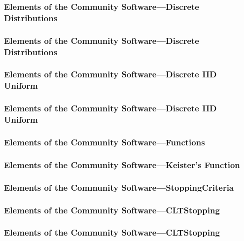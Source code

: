 \documentclass[11pt,compress,xcolor={usenames,dvipsnames},aspectratio=169]{beamer}
\begin{document}
\begin{frame}[fragile]
\frametitle{Elements of the Community Software---Discrete Distributions}
\vspace{-5ex}

\end{frame}

\begin{frame}[fragile]
\frametitle{Elements of the Community Software---Discrete Distributions}
\vspace{-5ex}

\end{frame}

\begin{frame}[fragile]
\frametitle{Elements of the Community Software---Discrete IID Uniform}
\vspace{-5ex}

\end{frame}

\begin{frame}[fragile]
\frametitle{Elements of the Community Software---Discrete IID Uniform}
\vspace{-5ex}

\end{frame}

\begin{frame}[fragile]
\frametitle{Elements of the Community Software---Functions}
\vspace{-5ex}

\end{frame}

\begin{frame}[fragile]
\frametitle{Elements of the Community Software---Keister's Function}
\vspace{-5ex}

\end{frame}

\begin{frame}[fragile]
\frametitle{Elements of the Community Software---StoppingCriteria}
\vspace{-5ex}

\end{frame}

\begin{frame}[fragile]
\frametitle{Elements of the Community Software---CLTStopping}
\vspace{-5ex}

\end{frame}

\begin{frame}[fragile]
\frametitle{Elements of the Community Software---CLTStopping}
\vspace{-5ex}

\end{frame}
\end{document}

